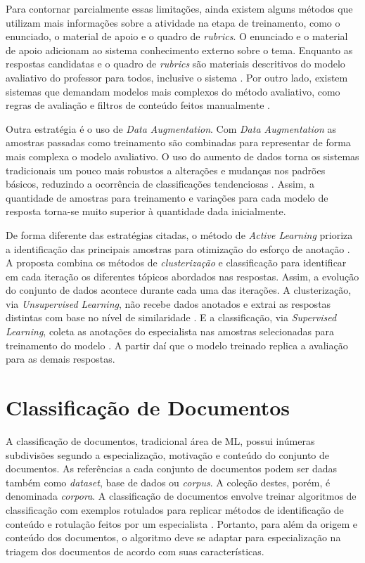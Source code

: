 Para contornar parcialmente essas limitações, ainda existem alguns métodos que utilizam mais informações sobre a atividade na etapa de treinamento, como o enunciado, o material de apoio e o quadro de \textit{rubrics}\cite{ramachandran2015b, wang2019}. O enunciado e o material de apoio adicionam ao sistema conhecimento externo sobre o tema. Enquanto as respostas candidatas e o quadro de \textit{rubrics} são materiais descritivos do modelo avaliativo do professor para todos, inclusive o sistema \cite{mizumoto2019, marvaniya2018}. Por outro lado, existem sistemas que demandam modelos mais complexos do método avaliativo, como regras de avaliação e filtros de conteúdo feitos manualmente \cite{pribadi2017, butcher2010}.

Outra estratégia é o uso de \textit{Data Augmentation}. Com \textit{Data Augmentation} as amostras passadas como treinamento são combinadas para representar de forma mais complexa o modelo avaliativo. O uso do aumento de dados torna os sistemas tradicionais um pouco mais robustos a alterações e mudanças nos padrões básicos, reduzindo a ocorrência de classificações tendenciosas \cite{kumar2019, lun2020}. Assim, a quantidade de amostras para treinamento e variações para cada modelo de resposta torna-se muito superior à quantidade dada inicialmente.

De forma diferente das estratégias citadas, o método de \textit{Active Learning} prioriza a identificação das principais amostras para otimização do esforço de anotação \cite{kumar2020}. A proposta combina os métodos de \textit{clusterização} e classificação \cite{oliveira2014} para identificar em cada iteração os diferentes tópicos abordados nas respostas. Assim, a evolução do conjunto de dados acontece durante cada uma das iterações. A clusterização, via \textit{Unsupervised Learning}, não recebe dados anotados e extrai as respostas distintas com base no nível de similaridade \cite{everitt2011}. E a classificação, via \textit{Supervised Learning}, coleta as anotações do especialista nas amostras selecionadas para treinamento do modelo \cite{bishop2006}. A partir daí que o modelo treinado replica a avaliação para as demais respostas.


\section{Classificação de Documentos}

A classificação de documentos, tradicional área de ML, possui inúmeras subdivisões segundo a especialização, motivação e conteúdo do conjunto de documentos. As referências a cada conjunto de documentos podem ser dadas também como \textit{dataset}, base de dados ou \textit{corpus}. A coleção destes, porém, é denominada \textit{corpora}. A classificação de documentos envolve treinar algoritmos de classificação com exemplos rotulados para replicar métodos de identificação de conteúdo e rotulação feitos por um especialista \cite{baeza2011}. Portanto, para além da origem e conteúdo dos documentos, o algoritmo deve se adaptar para especialização na triagem dos documentos de acordo com suas características.

